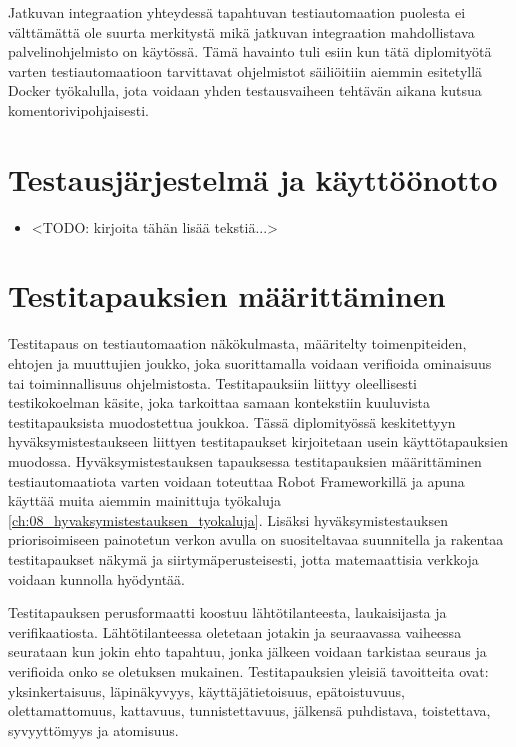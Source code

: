     Jatkuvan integraation yhteydessä tapahtuvan testiautomaation puolesta ei välttämättä ole suurta merkitystä mikä jatkuvan integraation mahdollistava palvelinohjelmisto on käytössä.
    Tämä havainto tuli esiin kun tätä diplomityötä varten testiautomaatioon tarvittavat ohjelmistot säiliöitiin aiemmin esitetyllä Docker työkalulla, jota voidaan yhden testausvaiheen tehtävän aikana kutsua komentorivipohjaisesti.

\section{Testausjärjestelmä ja käyttöönotto} \label{ch:08_testausjarjestelma_ja_kayttoonotto}

  \begin{itemize}
    \item <TODO: kirjoita tähän lisää tekstiä...>
  \end{itemize}

\section{Testitapauksien määrittäminen} \label{ch:08_testitapauksien_maarittaminen}

  Testitapaus on testiautomaation näkökulmasta, määritelty toimenpiteiden, ehtojen ja muuttujien joukko, joka suorittamalla voidaan verifioida ominaisuus tai toiminnallisuus ohjelmistosta.
  Testitapauksiin liittyy oleellisesti testikokoelman käsite, joka tarkoittaa samaan kontekstiin kuuluvista testitapauksista muodostettua joukkoa.
  Tässä diplomityössä keskitettyyn hyväksymistestaukseen liittyen testitapaukset kirjoitetaan usein käyttötapauksien muodossa.
  Hyväksymistestauksen tapauksessa testitapauksien määrittäminen testiautomaatiota varten voidaan toteuttaa Robot Frameworkillä ja apuna käyttää muita aiemmin  mainittuja työkaluja \ref{ch:08_hyvaksymistestauksen_tyokaluja}.
  Lisäksi hyväksymistestauksen priorisoimiseen painotetun verkon avulla on suositeltavaa suunnitella ja rakentaa testitapaukset näkymä ja siirtymäperusteisesti, jotta matemaattisia verkkoja voidaan kunnolla hyödyntää.

  Testitapauksen perusformaatti koostuu lähtötilanteesta, laukaisijasta ja verifikaatiosta.
  Lähtötilanteessa oletetaan jotakin ja seuraavassa vaiheessa seurataan kun jokin ehto tapahtuu, jonka jälkeen voidaan tarkistaa seuraus ja verifioida onko se oletuksen mukainen.
  Testitapauksien yleisiä tavoitteita ovat: yksinkertaisuus, läpinäkyvyys, käyttäjätietoisuus, epätoistuvuus, olettamattomuus, kattavuus, tunnistettavuus, jälkensä puhdistava, toistettava, syvyyttömyys ja atomisuus.

